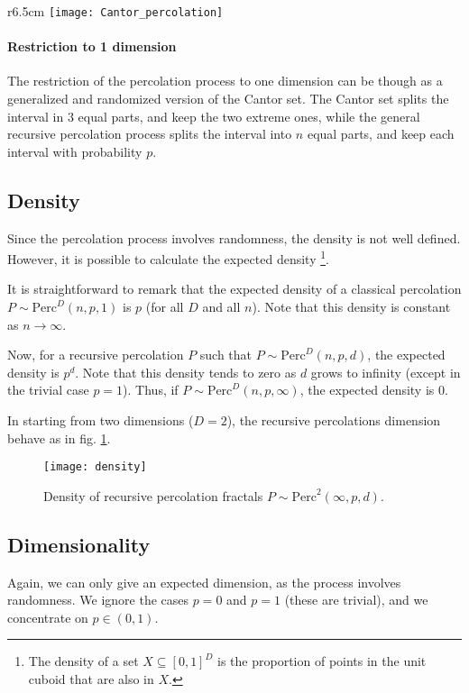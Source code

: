 \begin{wrapfigure}{r}{6.5cm}
	\vspace{-0.5cm}
	\centering
	\texttt{[image: Cantor\_percolation]}
	\caption{1D Recursive Percolation\\($n=3, d=4, p=0.6$)}
	\label{fig:CantorPercolation}
	\vspace{-1cm}
\end{wrapfigure}
\paragraph{Restriction to 1 dimension}
The restriction of the percolation process to one dimension can be though as a generalized and randomized version of the Cantor set.
The Cantor set splits the interval in 3 equal parts, and keep the two extreme ones, while the general recursive percolation process splits the interval into $n$ equal parts, and keep each interval with probability $p$.

\subsection{Density}\label{density}
Since the percolation process involves randomness, the density is not well defined.
However, it is possible to calculate the expected density
\footnote{The density of a set $X \subseteq \left[ 0,1 \right]^D$ is the proportion of points in the unit cuboid that are also in $X$.}.

It is straightforward to remark that the expected density of a classical percolation $P \sim \text{Perc}^D(n,p,1)$ is $p$ (for all $D$ and all $n$).
Note that this density is constant as $n \to \infty$.

Now, for a recursive percolation $P$ such that $P \sim \text{Perc}^D(n,p,d)$, the expected density is $p^d$.
Note that this density tends to zero as $d$ grows to infinity (except in the trivial case $p=1$).
Thus, if $P \sim \text{Perc}^D(n,p,\infty)$, the expected density is $0$.

In starting from two dimensions ($D = 2$), the recursive percolations dimension behave as in fig. \ref{fig:density}.
\begin{figure}[!h]
	\centering
	\texttt{[image: density]}
	\caption{Density of recursive percolation fractals $P \sim \text{Perc}^2(\infty,p,d)$.}
	\label{fig:density}
\end{figure}

\subsection{Dimensionality}
Again, we can only give an expected dimension, as the process involves randomness.
We ignore the cases $p=0$ and $p=1$ (these are trivial), and we concentrate on $p \in (0,1)$.

